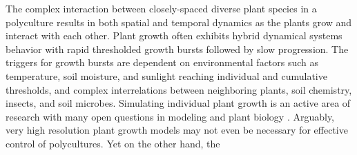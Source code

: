 
The complex interaction between closely-spaced diverse plant species in a polyculture results in both spatial and temporal dynamics as the plants grow and interact with each other. %
Plant growth often exhibits hybrid dynamical systems behavior with rapid thresholded growth bursts followed by slow progression. The triggers for growth bursts are dependent on  environmental factors such as temperature, soil moisture, and sunlight reaching individual and cumulative thresholds, and complex interrelations between neighboring plants, soil chemistry, insects, and soil microbes. 
Simulating individual plant growth is an active area of research with many open questions in modeling and plant biology \cite{zhu2016plants}. Arguably, very high resolution plant growth models may not even be necessary for effective control of polycultures. Yet on the other hand, the  %
